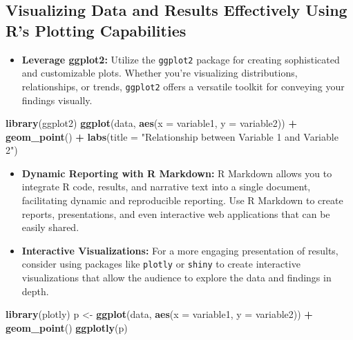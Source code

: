 \documentclass[
]{book}
\newenvironment{Shaded}{\begin{snugshade}}{\end{snugshade}}
\newcommand{\AttributeTok}[1]{\textcolor[rgb]{0.13,0.29,0.53}{#1}}
\newcommand{\FunctionTok}[1]{\textcolor[rgb]{0.13,0.29,0.53}{\textbf{#1}}}
\newcommand{\NormalTok}[1]{#1}
\newcommand{\OtherTok}[1]{\textcolor[rgb]{0.56,0.35,0.01}{#1}}
\newcommand{\SpecialCharTok}[1]{\textcolor[rgb]{0.81,0.36,0.00}{\textbf{#1}}}
\newcommand{\StringTok}[1]{\textcolor[rgb]{0.31,0.60,0.02}{#1}}
\providecommand{\tightlist}{%
  \setlength{\itemsep}{0pt}\setlength{\parskip}{0pt}}
\begin{document}
\subsection*{Visualizing Data and Results Effectively Using R's Plotting Capabilities}\label{visualizing-data-and-results-effectively-using-rs-plotting-capabilities}

\begin{itemize}
\tightlist
\item
  \textbf{Leverage ggplot2:} Utilize the \texttt{ggplot2} package for creating sophisticated and customizable plots. Whether you're visualizing distributions, relationships, or trends, \texttt{ggplot2} offers a versatile toolkit for conveying your findings visually.
\end{itemize}

\begin{Shaded}
\begin{Highlighting}[]
\FunctionTok{library}\NormalTok{(ggplot2)}
\FunctionTok{ggplot}\NormalTok{(data, }\FunctionTok{aes}\NormalTok{(}\AttributeTok{x =}\NormalTok{ variable1, }\AttributeTok{y =}\NormalTok{ variable2)) }\SpecialCharTok{+} 
  \FunctionTok{geom\_point}\NormalTok{() }\SpecialCharTok{+} 
  \FunctionTok{labs}\NormalTok{(}\AttributeTok{title =} \StringTok{"Relationship between Variable 1 and Variable 2"}\NormalTok{)}
\end{Highlighting}
\end{Shaded}

\begin{itemize}
\item
  \textbf{Dynamic Reporting with R Markdown:} R Markdown allows you to integrate R code, results, and narrative text into a single document, facilitating dynamic and reproducible reporting. Use R Markdown to create reports, presentations, and even interactive web applications that can be easily shared.
\item
  \textbf{Interactive Visualizations:} For a more engaging presentation of results, consider using packages like \texttt{plotly} or \texttt{shiny} to create interactive visualizations that allow the audience to explore the data and findings in depth.
\end{itemize}

\begin{Shaded}
\begin{Highlighting}[]
\FunctionTok{library}\NormalTok{(plotly)}
\NormalTok{p }\OtherTok{\textless{}{-}} \FunctionTok{ggplot}\NormalTok{(data, }\FunctionTok{aes}\NormalTok{(}\AttributeTok{x =}\NormalTok{ variable1, }\AttributeTok{y =}\NormalTok{ variable2)) }\SpecialCharTok{+} \FunctionTok{geom\_point}\NormalTok{()}
\FunctionTok{ggplotly}\NormalTok{(p)}
\end{Highlighting}
\end{Shaded}
\end{document}
